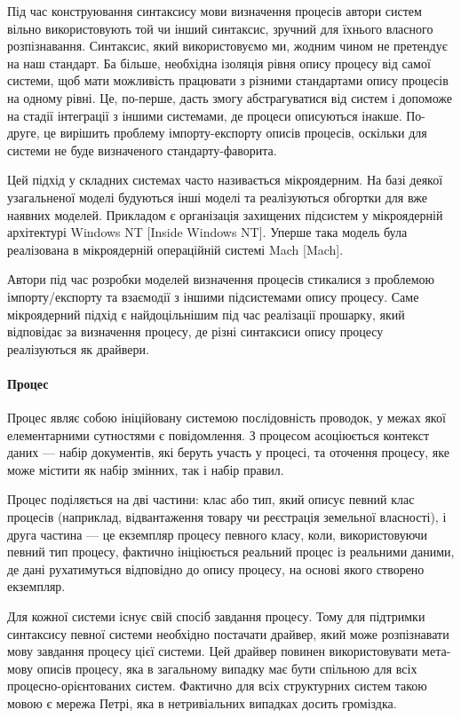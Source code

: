 \documentclass{memoir}
\begin{document}
Під час конструювання синтаксису мови визначення процесів автори систем вільно використовують той чи інший синтаксис, зручний для їхнього власного розпізнавання. Синтаксис, який використовуємо ми, жодним чином не претендує на наш стандарт. Ба більше, необхідна ізоляція рівня опису процесу від самої системи, щоб мати можливість працювати з різними стандартами опису процесів на одному рівні. Це, по-перше, дасть змогу абстрагуватися від систем і допоможе на стадії інтеграції з іншими системами, де процеси описуються інакше. По-друге, це вирішить проблему імпорту-експорту описів процесів, оскільки для системи не буде визначеного стандарту-фаворита.

Цей підхід у складних системах часто називається мікроядерним. На базі деякої узагальненої моделі будуються інші моделі та реалізуються обгортки для вже наявних моделей. Прикладом є організація захищених підсистем у мікроядерній архітектурі Windows NT [Inside Windows NT]. Уперше така модель була реалізована в мікроядерній операційній системі Mach [Mach].

Автори під час розробки моделей визначення процесів стикалися з проблемою імпорту/експорту та взаємодії з іншими підсистемами опису процесу. Саме мікроядерний підхід є найдоцільнішим під час реалізації прошарку, який відповідає за визначення процесу, де різні синтаксиси опису процесу реалізуються як драйвери.

\paragraph{Процес}

Процес являє собою ініційовану системою послідовність проводок, у межах якої елементарними сутностями є повідомлення. З процесом асоціюється контекст даних — набір документів, які беруть участь у процесі, та оточення процесу, яке може містити як набір змінних, так і набір правил.

Процес поділяється на дві частини: клас або тип, який описує певний клас процесів (наприклад, відвантаження товару чи реєстрація земельної власності), і друга частина — це екземпляр процесу певного класу, коли, використовуючи певний тип процесу, фактично ініціюється реальний процес із реальними даними, де дані рухатимуться відповідно до опису процесу, на основі якого створено екземпляр.

Для кожної системи існує свій спосіб завдання процесу. Тому для підтримки синтаксису певної системи необхідно постачати драйвер, який може розпізнавати мову завдання процесу цієї системи. Цей драйвер повинен використовувати мета-мову описів процесу, яка в загальному випадку має бути спільною для всіх процесно-орієнтованих систем. Фактично для всіх структурних систем такою мовою є мережа Петрі, яка в нетривіальних випадках досить громіздка.
\end{document}

